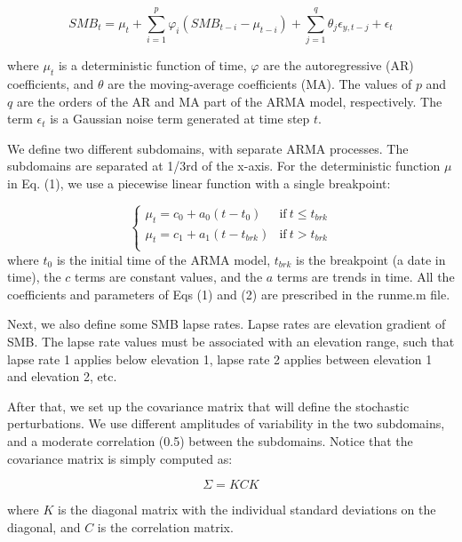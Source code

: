 \begin{equation} \label{eq1}
    \textit{SMB}_{t} = \mu_{t} + \sum_{i=1}^{p} \varphi_i \left(\textit{SMB}_{t-i}-\mu_{t-i}\right) + \sum_{j=1}^{q} \theta_{j} \epsilon_{y,t-j} + \epsilon_{t}
\end{equation}

where $\mu_{t}$ is a deterministic function of time, $\varphi$ are the autoregressive (AR) coefficients, and $\theta$ are the moving-average coefficients (MA). The values of $p$ and $q$ are the orders of the AR and MA part of the ARMA model, respectively. The term $\epsilon_{t}$ is a Gaussian noise term generated at time step $t$.

We define two different subdomains, with separate ARMA processes. The subdomains are separated at 1/3rd of the x-axis. For the deterministic function $\mu$ in Eq. (1), we use a piecewise linear function with a single breakpoint:

\begin{equation} \label{eq2}
\begin{cases}
    \mu_{t} = c_{0}+a_{0}\left(t-t_{0}\right) & \mathrm{if \:}t\leq t_{\textit{brk}}  \\
    \mu_{t} = c_{1}+a_{1}\left(t-t_{\textit{brk}}\right) & \mathrm{if \:} t>t_{\textit{brk}}  \\
\end{cases}
\end{equation}
where $t_{0}$ is the initial time of the ARMA model, $t_{brk}$ is the breakpoint (a date in time), the $c$ terms are constant values, and the $a$ terms are trends in time. All the coefficients and parameters of Eqs (1) and (2) are prescribed in the runme.m file. 

Next, we also define some SMB lapse rates. Lapse rates are elevation gradient of SMB. The lapse rate values must be associated with an elevation range, such that lapse rate 1 applies below elevation 1, lapse rate 2 applies between elevation 1 and elevation 2, etc.

After that, we set up the covariance matrix that will define the stochastic perturbations. We use different amplitudes of variability in the two subdomains, and a moderate correlation (0.5) between the subdomains. Notice that the covariance matrix is simply computed as:

\begin{equation} \label{eq3}
    \Sigma = KCK
\end{equation}

where $K$ is the diagonal matrix with the individual standard deviations on the diagonal, and $C$ is the correlation matrix.

